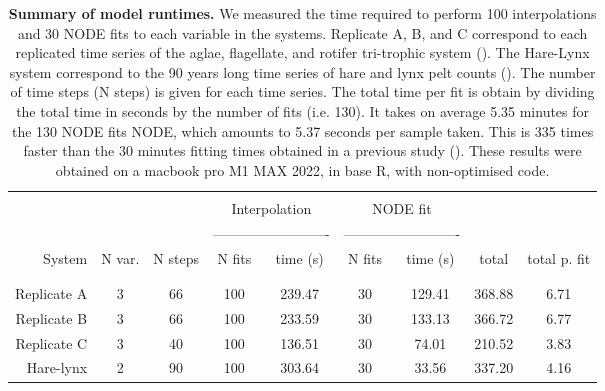 \documentclass[11pt, oneside]{article}
\begin{document}
\newpage
\begin{table}[H]
\begin{center}
\caption{
\textbf{Summary of model runtimes.}
We measured the time required to perform 100 interpolations and 30 NODE fits to each variable in the systems.
Replicate A, B, and C correspond to each replicated time series of the aglae, flagellate, and rotifer tri-trophic system (\cite{Hiltunen2013}).
The Hare-Lynx system correspond to the 90 years long time series of hare and lynx pelt counts (\cite{Odum1972}).
The number of time steps (N steps) is given for each time series. 
The total time per fit is obtain by dividing the total time in seconds by the number of fits (i.e. 130).
It takes on average 5.35 minutes for the 130 NODE fits NODE, which amounts to 5.37 seconds per sample taken. 
This is 335 times faster than the 30 minutes fitting times obtained in a previous study (\cite{Bonnaffe2021a}).
These results were obtained on a macbook pro M1 MAX 2022, in base R, with non-optimised code.
}
\begin{tabular}{rcccccccc}
\hline
& \\
& & & \multicolumn{2}{c}{Interpolation} & \multicolumn{2}{c}{NODE fit} & &  \\
& & & \multicolumn{2}{c}{-------------------------} & \multicolumn{2}{c}{-------------------------} & &  \\
System & N var. & N steps & N fits & time (s) & N fits & time (s) & total & total p. fit \\
& \\
\hline
& \\
Replicate A & 3 & 66 &  100 & 239.47 & 30 & 129.41 & 368.88 & 6.71 \\
Replicate B & 3 & 66 &  100 & 233.59 & 30 & 133.13 & 366.72 & 6.77 \\
Replicate C & 3 & 40 &  100 & 136.51 & 30 &  74.01 & 210.52 & 3.83 \\
Hare-lynx   & 2 & 90 &  100 & 303.64 & 30 &  33.56 & 337.20 & 4.16 \\
\end{tabular}
\end{center}
\end{table}
\newpage
\end{document}

